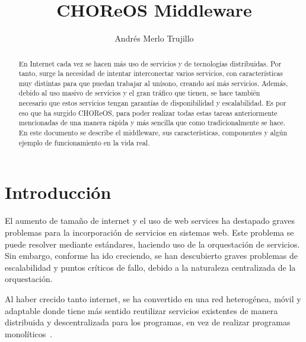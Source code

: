 \documentclass[runningheads]{llncs}
\begin{document}
%
\title{CHOReOS Middleware}
%
%
\author{Andrés Merlo Trujillo}
%
%
%
\maketitle              %
%
\begin{abstract}
En Internet cada vez se hacen más uso de servicios y de tecnologías distribuidas. Por tanto, surge la necesidad de intentar interconectar varios servicios, con características muy distintas para que puedan trabajar al unísono, creando así más servicios. Además, debido al uso masivo de servicios y el gran tráfico que tienen, se hace también necesario que estos servicios tengan garantías de disponibilidad y escalabilidad. Es por eso que ha surgido CHOReOS, para poder realizar todas estas tareas anteriormente mencionadas de una manera rápida y más sencilla que como tradicionalmente se hace. En este documento se describe el middleware, sus características, componentes y algún ejemplo de funcionamiento en la vida real.

\end{abstract}
%
%
%

\section{Introducción}
El aumento de tamaño de internet y el uso de web services ha destapado graves problemas para la incorporación de servicios en sistemas web. Este problema se puede resolver mediante estándares, haciendo uso de la orquestación de servicios. Sin embargo, conforme ha ido creciendo, se han descubierto graves problemas de escalabilidad y puntos críticos de fallo, debido a la naturaleza centralizada de la orquestación. ~\cite{a_1}

Al haber crecido tanto internet, se ha convertido en una red heterogénea, móvil y adaptable donde tiene más sentido reutilizar servicios existentes de manera distribuida y descentralizada para los programas, en vez de realizar programas monolíticos~\cite{a_2}.
\end{document}
